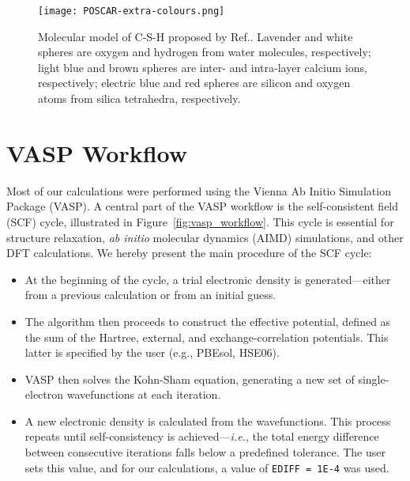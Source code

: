 \begin{figure}[h]
    \centering
    \texttt{[image: POSCAR-extra-colours.png]}
    \caption{Molecular model of C-S-H proposed by Ref.\supercite{Pellenq2009}. Lavender and white spheres are oxygen and hydrogen from water molecules, respectively; light blue and brown spheres are inter- and intra-layer calcium ions, respectively; electric blue and red spheres are silicon and oxygen atoms from silica tetrahedra, respectively.}
    \label{fig:csh_structure}
\end{figure}

\section{VASP Workflow}
\label{sec:vasp-workflow}
Most of our calculations were performed using the Vienna Ab Initio Simulation Package (VASP). A central part of the VASP workflow is the self-consistent field (SCF) cycle, illustrated in Figure~\ref{fig:vasp_workflow}. This cycle is essential for structure relaxation, \emph{ab initio} molecular dynamics (AIMD) simulations, and other DFT calculations. We hereby present the main procedure of the SCF cycle:

\begin{itemize}
    \item At the beginning of the cycle, a trial electronic density is generated---either from a previous calculation or from an initial guess. 
    \item The algorithm then proceeds to construct the effective potential, defined as the sum of the Hartree, external, and exchange-correlation potentials. This latter is specified by the user (e.g., PBEsol, HSE06).
    \item VASP then solves the Kohn-Sham equation, generating a new set of single-electron wavefunctions at each iteration. 
    \item A new electronic density is calculated from the wavefunctions. This process repeats until self-consistency is achieved---\emph{i.e.}, the total energy difference between consecutive iterations falls below a predefined tolerance. The user sets this value, and for our calculations, a value of \texttt{EDIFF = 1E-4} was used. 
\end{itemize}



